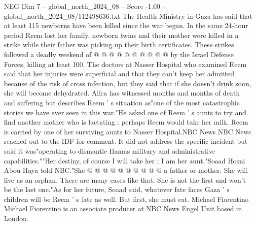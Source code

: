 \begin{textsample}{NEG Dim 7 – global\_north\_2024\_08 – Score -1.00 – global\_north\_2024\_08/112498636.txt}
The Health Ministry in Gaza has said that at least 115 newborns have been killed since the war began.
In the same 24-hour period Reem lost her family, newborn twins and their mother were killed in a strike while their father was picking up their birth certificates.
These strikes followed a deadly weekend of @ @ @ @ @ @ @ @ @ @ by the Israel Defense Forces, killing at least 100.
The doctors at Nasser Hospital who examined Reem said that her injuries were superficial and that they can't keep her admitted because of the risk of cross infection, but they said that if she doesn't drink soon, she will become dehydrated.
Alfra has witnessed months and months of death and suffering but describes Reem ' s situation as"one of the most catastrophic stories we have ever seen in this war."He asked one of Reem ' s aunts to try and find another mother who is lactating ; perhaps Reem would take her milk.
Reem is carried by one of her surviving aunts to Nasser Hospital.NBC News NBC News reached out to the IDF for comment.
It did not address the specific incident but said it was"operating to dismantle Hamas military and administrative capabilities.""Her destiny, of course I will take her ; I am her aunt,"Soaad Hosni Abou Haya told NBC."She @ @ @ @ @ @ @ @ @ @ a father or mother.
She will live as an orphan.
There are many cases like that.
She is not the first and won't be the last one."As for her future, Soaad said, whatever fate faces Gaza ' s children will be Reem ' s fate as well.
But first, she must eat.
Michael Fiorentino Michael Fiorentino is an associate producer at NBC News Engel Unit based in London.

\end{textsample}
